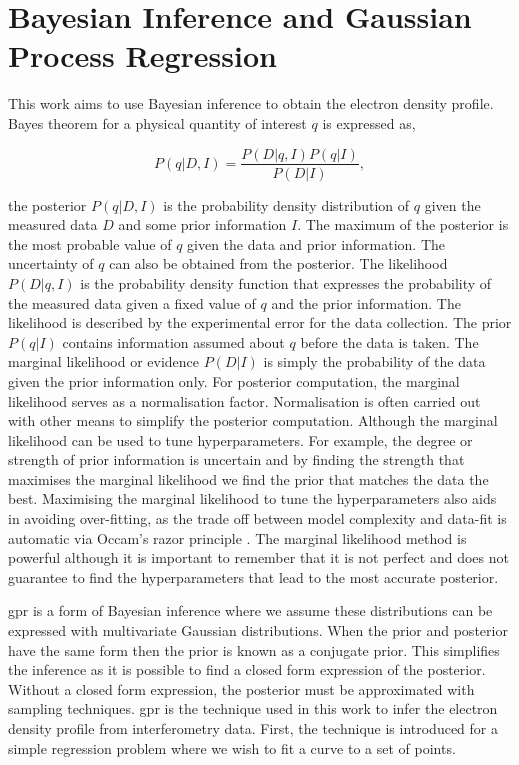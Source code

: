 \section{Bayesian Inference and Gaussian Process Regression}\label{sec:BIandGPR}

This work aims to use Bayesian inference to obtain the electron density profile. Bayes theorem for a physical quantity of interest $q$ is expressed as,

\begin{equation} 
  P(q|D,I) = \frac{P(D|q,I) P(q|I)}{P(D|I)},
  \label{eq:bayesth}
\end{equation}

\noindent the posterior $P(q|D,I)$ is the probability density distribution of $q$ given the measured data $D$ and some prior information $I$. The maximum of the posterior is the most probable value of $q$ given the data and prior information. The uncertainty of $q$ can also be obtained from the posterior. The likelihood $P(D|q,I)$ is the probability density function that expresses the probability of the measured data given a fixed value of $q$ and the prior information. The likelihood is described by the experimental error for the data collection. The prior $P(q|I)$ contains information assumed about $q$ before the data is taken. The marginal likelihood or evidence $P(D|I)$ is simply the probability of the data given the prior information only. For posterior computation, the marginal likelihood serves as a normalisation factor. Normalisation is often carried out with other means to simplify the posterior computation. Although the marginal likelihood can be used to tune hyperparameters. For example, the degree or strength of prior information is uncertain and by finding the strength that maximises the marginal likelihood we find the prior that matches the data the best. Maximising the marginal likelihood to tune the hyperparameters also aids in avoiding over-fitting, as the trade off between model complexity and data-fit is automatic via Occam's razor principle \cite{oscraz}. The marginal likelihood method is powerful although it is important to remember that it is not perfect and does not guarantee to find the hyperparameters that lead to the most accurate posterior.

\gls{gpr} is a form of Bayesian inference where we assume these distributions can be expressed with multivariate Gaussian distributions. When the prior and posterior have the same form then the prior is known as a conjugate prior. This simplifies the inference as it is possible to find a closed form expression of the posterior. Without a closed form expression, the posterior must be approximated with sampling techniques. \gls{gpr} is the technique used in this work to infer the electron density profile from interferometry data. First, the technique is introduced for a simple regression problem where we wish to fit a curve to a set of points.

